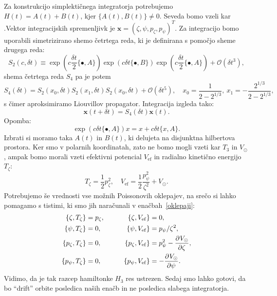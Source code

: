 \documentclass[12pt, a4paper]{article}
\newcommand{\sfrac}[2]{
    \ensuremath{\textstyle{\frac{#1}{#2}}}
}
\newcommand{\der}[3][]{
    \ensuremath{ \frac{\partial^{#1} #2}{\partial #3^{#1}} }
}
\newcommand{\Vef}{
    \ensuremath{V_\mathrm{ef}}
}
\begin{document}
Za konstrukcijo simplekti\v cnega integratorja potrebujemo $H(t) = A(t) + B(t)$, kjer $\{A(t), B(t)\} \neq 0$.
Seveda bomo vzeli kar .Vektor integracijskih spremenljivk
je $\mathbf{x} = (\zeta, \psi, p_\zeta, p_\psi)^T$. Za integracijo bomo uporabili simetrizirano shemo
\v cetrtega reda, ki je definirana s pomo\v cjo sheme drugega reda:
\[
    S_2(c,\delta t) \equiv \exp(c\sfrac{\delta t}{2}\{\bullet, A\})\exp(c\delta t\{\bullet, B\})
    \exp(c\sfrac{\delta t}{2}\{\bullet, A\}) + \mathcal{O}(\delta t^3),
\]
shema \v cetrtega reda $S_4$ pa je potem
\begin{equation}
    S_4(\delta t) = S_2(x_0, \delta t) S_2 (x_1, \delta t) S_2 (x_0, \delta t) + \mathcal{O}(\delta t^5), \quad
        x_0 = \frac{1}{2 - 2^{1/3}},\ x_1 = -\frac{2^{1/3}}{2 - 2^{1/3}},
\end{equation}
s \v cimer aproksimiramo Liouvillov propagator. Integracija izgleda tako:
\[
    \mathbf{x}(t + \delta t) = S_4(\delta t) \mathbf{x}(t).
\]
Opomba:
\[
    \exp(c\delta t\{\bullet, A\})x = x + c\delta t\{x, A\}.
\]
Izbrati si moramo taka $A(t)$ in $B(t)$, ki delujeta na disjunktna hilbertova prostora. Ker smo v polarnih koordinatah,
zato ne bomo mogli vzeti kar $T_3$ in $V_\odot$, ampak bomo morali vzeti efektivni potencial $\Vef$ in radialno
kineti\v cno energijo $T_\zeta$:
\begin{equation}
    T_\zeta = \frac{1}{2}p_\zeta^2, \quad \Vef = \frac{1}{2}\frac{p_\psi^2}{\zeta^2} + V_\odot.
\end{equation}
Potrebujemo \v se vrednosti vse mo\v znih Poissonovih oklepajev, na sre\v co si lahko pomagamo s tistimi, ki
smo jih nara\v cunali v ena\v cbah~\eqref{oklepaji}:
\begin{alignat}{3}
    \{\zeta, T_\zeta\}        &= p_\zeta, \qquad &
    \{\zeta, \Vef\}           &= 0, \notag \\
    \{\psi, T_\zeta\}         &= 0, \qquad &
    \{\psi, \Vef\}            &= p_\psi/\zeta^2, \notag \\
    \{p_\zeta, T_\zeta\}      &= 0, \qquad&
    \{p_\zeta, \Vef\}         &= p^2_\psi - \der{V_\odot}{\zeta}, \notag \\
    \{p_\psi, T_\zeta\}       &= 0, \qquad &
    \{p_\psi, \Vef\}          &= -\der{V_\odot}{\psi}.
\end{alignat}
Vidimo, da je tak razcep hamiltonke $H_3$ res ustrezen. Sedaj smo lahko gotovi, da bo "`drift"' orbite posledica
na\v sih ena\v cb in ne posledica slabega integratorja.
\end{document}
